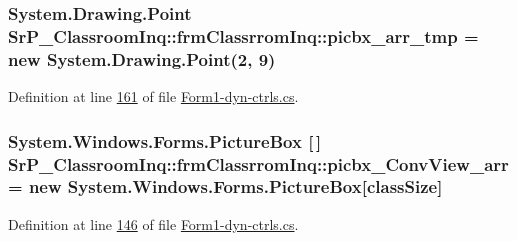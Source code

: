 \hypertarget{class_sr_p___classroom_inq_1_1frm_classrrom_inq_a019be294be5d02bea4369298d2a135db}{
\subsubsection[{picbx\-\_\-arr\-\_\-tmp}]{\setlength{\rightskip}{0pt plus 5cm}\-System.\-Drawing.\-Point {\bf \-Sr\-P\-\_\-\-Classroom\-Inq\-::frm\-Classrrom\-Inq\-::picbx\-\_\-arr\-\_\-tmp} = new \-System.\-Drawing.\-Point(2, 9)}}
\label{class_sr_p___classroom_inq_1_1frm_classrrom_inq_a019be294be5d02bea4369298d2a135db}


\-Definition at line \hyperlink{_form1-dyn-ctrls_8cs_source_l00161}{161} of file \hyperlink{_form1-dyn-ctrls_8cs_source}{\-Form1-\/dyn-\/ctrls.\-cs}.

\hypertarget{class_sr_p___classroom_inq_1_1frm_classrrom_inq_a4d179283a68569b1220534d91ddcf6d1}{
\subsubsection[{picbx\-\_\-\-Conv\-View\-\_\-arr}]{\setlength{\rightskip}{0pt plus 5cm}\-System.\-Windows.\-Forms.\-Picture\-Box \mbox{[}$\,$\mbox{]} {\bf \-Sr\-P\-\_\-\-Classroom\-Inq\-::frm\-Classrrom\-Inq\-::picbx\-\_\-\-Conv\-View\-\_\-arr} = new \-System.\-Windows.\-Forms.\-Picture\-Box\mbox{[}{\bf class\-Size}\mbox{]}}}
\label{class_sr_p___classroom_inq_1_1frm_classrrom_inq_a4d179283a68569b1220534d91ddcf6d1}


\-Definition at line \hyperlink{_form1-dyn-ctrls_8cs_source_l00146}{146} of file \hyperlink{_form1-dyn-ctrls_8cs_source}{\-Form1-\/dyn-\/ctrls.\-cs}.

